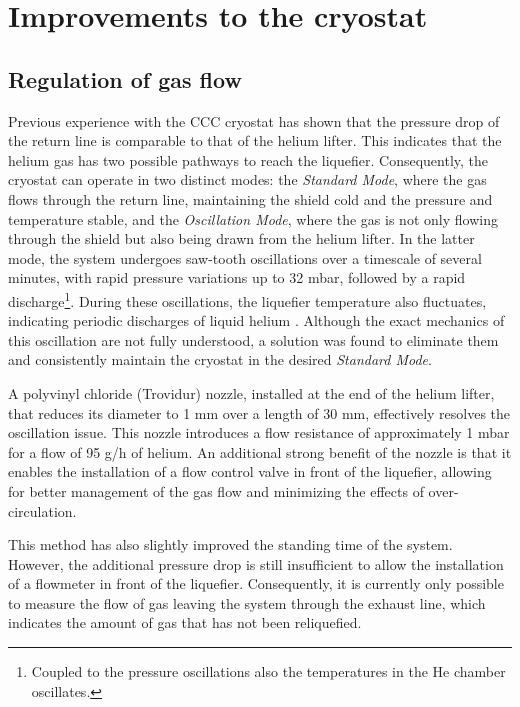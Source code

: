 \documentclass[12pt,a4paper]{report}
\begin{document}
        \section{Improvements to the cryostat}
        \subsection{Regulation of gas flow}
        Previous experience with the CCC cryostat \cite{DavidThesis} has shown that the pressure drop of the return line is comparable to that of the helium lifter. This indicates that the helium gas has two possible pathways to reach the liquefier. Consequently, the cryostat can operate in two distinct modes: the \textit{Standard Mode}, where the gas flows through the return line, maintaining the shield cold and the pressure and temperature stable, and the \textit{Oscillation Mode}, where the gas is not only flowing through the shield but also being drawn from the helium lifter. In the latter mode, the system undergoes saw-tooth oscillations over a timescale of several minutes, with rapid pressure variations up to 32 mbar, followed by a rapid discharge\footnote{Coupled to the pressure oscillations also the temperatures in the He chamber oscillates.}. During these oscillations, the liquefier temperature also fluctuates, indicating periodic discharges of liquid helium  \cite{DavidThesis}. Although the exact mechanics of this oscillation are not fully understood, a solution was found to eliminate them and consistently maintain the cryostat in the desired \textit{Standard Mode}.
        
        A polyvinyl chloride (Trovidur\textregistered) nozzle, installed at the end of the helium lifter, that reduces its diameter to 1 mm over a length of 30 mm, effectively resolves the oscillation issue. This nozzle introduces a flow resistance of approximately 1 mbar for a flow of 95 g/h of helium. An additional strong benefit of the nozzle is that it enables the installation of a flow control valve in front of the liquefier, allowing for better management of the gas flow and minimizing the effects of over-circulation.
        
        This method has also slightly improved the standing time of the system. However, the additional pressure drop is still insufficient to allow the installation of a flowmeter in front of the liquefier. Consequently, it is currently only possible to measure the flow of gas leaving the system through the exhaust line, which indicates the amount of gas that has not been reliquefied.
        
\end{document}
